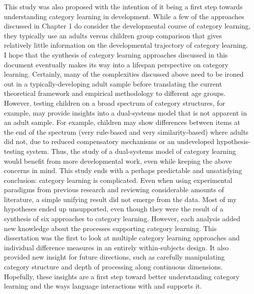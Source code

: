 \documentclass[../dissertation.tex]{subfiles}
\begin{document}
	This study was also proposed with the intention of it being a first step towards understanding category learning in development. While a few of the approaches discussed in Chapter 1 do consider the developmental course of category learning, they typically use an adults versus children group comparison that gives relatively little information on the developmental trajectory of category learning. I hope that the synthesis of category learning approaches discussed in this document eventually makes its way into a lifespan perspective on category learning. Certainly, many of the complexities discussed above need to be ironed out in a typically-developing adult sample before translating the current theoretical framework and empirical methodology to different age groups. However, testing children on a broad spectrum of category structures, for example, may provide insights into a dual-systems model that is not apparent in an adult sample. For example, children may show differences between items at the end of the spectrum (very rule-based and very similarity-based) where adults did not, due to reduced compensatory mechanisms or an undeveloped hypothesis-testing system. Thus, the study of a dual-systems model of category learning would benefit from more developmental work, even while keeping the above concerns in mind.
	This study ends with a perhaps predictable and unsatisfying conclusion: category learning is complicated. Even when using experimental paradigms from previous research and reviewing considerable amounts of literature, a simple unifying result did not emerge from the data. Most of my hypotheses ended up unsupported, even though they were the result of a synthesis of six approaches to category learning. However, each analysis added new knowledge about the processes supporting category learning. This dissertation was the first to look at multiple category learning approaches and individual difference measures in an entirely within-subjects design. It also provided new insight for future directions, such as carefully manipulating category structure and depth of processing along continuous dimensions. Hopefully, these insights are a first step toward better understanding category learning and the ways language interactions with and supports it.
	
\end{document}
